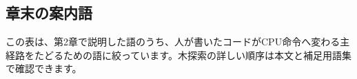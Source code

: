 \newcommand{\ChapterTwoSupplementalTerms}{%
\begin{description}
  \item[\term{アセンブリ}] 機械語命令へ人が読める短い名前を付けた表記です。
  \item[\term{分岐}] 条件または無条件で次に実行する命令位置を変える処理です。
  \item[\term{ソースコード}] 人が読み書きするプログラミング言語で記した変換前のプログラムです。
  \item[\term{実行可能形式}] OSがロードして実行を開始できるファイル形式です。
  \item[\term{ローダ}] 実行可能形式をメモリへ配置し、実行準備を行う処理です。
  \item[\term{正規表現}] 文字列のパターンを記述する形式です。
  \item[\term{EBNF}] Extended Backus--Naur Formの略で、文法規則を記述する記法です。
  \item[\term{パーサ}] トークン列を文法に従って構造へ変換する処理です。
  \item[\term{ベースケース}] 再帰呼び出しを終了して値を返す条件です。
  \item[\term{前順走査}] 親ノードを子ノードより先に訪れる木の走査です。
  \item[\term{中順走査}] 二分木で左の子、親、右の子の順に訪れる走査です。
  \item[\term{後順走査}] 子ノードを親ノードより先に訪れる木の走査です。
  \item[\term{優先順位}] 演算子がどの順に結合するかを決める規則です。
  \item[\term{結合規則}] 同じ優先順位の演算子を左または右のどちらからまとめるか決める規則です。
  \item[\term{意味解析}] 構文が表す名前、型、作用域などの意味を確認する処理です。
\end{description}%
}

\subsection*{章末の案内語}

この表は、第2章で説明した語のうち、人が書いたコードがCPU命令へ変わる主経路をたどるための語に絞っています。木探索の詳しい順序は本文と補足用語集で確認できます。

